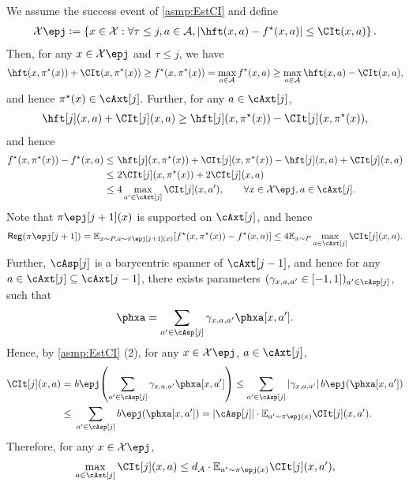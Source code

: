 We assume the success event of \cref{asmp:EstCI} and define
\begin{align*}
    \cX\epj\defeq \sset{ x\in\cX: \forall \tau\leq j, a\in\cA,  \abs{ \hft(x,a)-\fs(x,a) }\leq \CIt(x,a) }.
\end{align*}
Then, for any $x\in\cX\epj$ and $\tau\leq j$, we have
\begin{align*}
    \hft(x,\pis(x))+\CIt(x,\pis(x))\geq \fs(x,\pis(x))
    =\max_{a\in\cA} \fs(x,a)
    \geq \max_{a\in\cA} \hft(x,a)-\CIt(x,a),
\end{align*}
and hence
$\pis(x)\in\cAxt[j]$. Further, for any $a\in\cAxt[j]$,
\begin{align*}
    \hft[j](x,a)+\CIt[j](x,a)\geq \hft[j](x,\pis(x))-\CIt[j](x,\pis(x)),
\end{align*}
and hence
\begin{align*}
    \fs(x,\pis(x))-\fs(x,a)
    \leq&~ \hft[j](x,\pis(x))+\CIt[j](x,\pis(x))-\hft[j](x,a)+\CIt[j](x,a)\\
    \leq&~ 2\CIt[j](x,\pis(x))+2\CIt[j](x,a) \\
    \leq&~ 4\max_{a'\in\cAxt[j]}\CIt[j](x,a'), \qquad \forall x\in\cX\epj, a\in\cAxt[j].
\end{align*}
Note that $\pi\epj[j+1](x)$ is supported on $\cAxt[j]$, and hence
\begin{align*}
    \reg(\pi\epj[j+1])=\EE_{x\sim P, a\sim \pi\epj[j+1](x)}\brac{ \fs(x,\pis(x))- \fs(x,a) }
    \leq 4\EE_{x\sim P} \max_{a\in\cAxt[j]}\CIt[j](x,a).
\end{align*}
Further, $\cAsp[j]$ is a barycentric spanner of $\cAxt[j-1]$, and hence for any $a\in\cAxt[j]\subseteq \cAxt[j-1]$, there exists parameters $(\gamma_{x,a,a'}\in[-1,1])_{a'\in\cAsp[j]}$, such that
\begin{align*}
    \phxa=\sum_{a'\in\cAsp[j]} \gamma_{x,a,a'} \phxa[x,a'].
\end{align*}
Hence, by \cref{asmp:EstCI} (2), for any $x\in\cX\epj$, $a\in\cAxt[j]$,
\begin{align*}
    \CIt[j](x,a)=&~ b\epj\paren{ \sum_{a'\in\cAsp[j]} \gamma_{x,a,a'} \phxa[x,a'] } 
    \leq \sum_{a'\in\cAsp[j]} \abs{\gamma_{x,a,a'}} b\epj(\phxa[x,a']) \\
    \leq&~ \sum_{a'\in\cAsp[j]} b\epj(\phxa[x,a'])
    = |\cAsp[j]|\cdot \EE_{a'\sim \pi\epj(x)} \CIt[j](x,a').
\end{align*}
Therefore, for any $x\in\cX\epj$,
\begin{align*}
    \max_{a\in\cAxt[j]}\CIt[j](x,a)\leq \dA \cdot \EE_{a'\sim \pi\epj(x)} \CIt[j](x,a'),
\end{align*}
